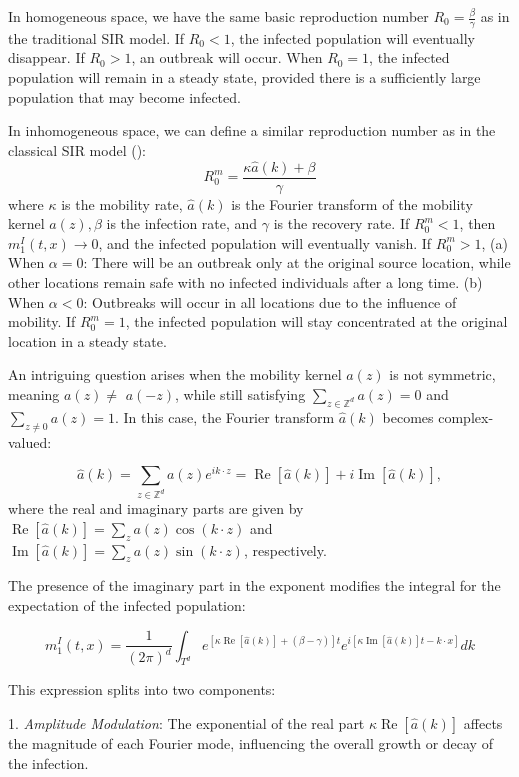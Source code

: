\documentclass[sn-basic]{sn-jnl}%
\theoremstyle{thmstyleone}%
\theoremstyle{thmstyletwo}%
\theoremstyle{thmstylethree}%
\numberwithin{equation}{theorem}
\begin{document}
In homogeneous space, we have the same basic reproduction number $R_0=\frac{\beta}{\gamma}$ as in the traditional SIR model. If $R_0<1$, the infected population will eventually disappear. If $R_0>1$, an outbreak will occur. When $R_0=1$, the infected population will remain in a steady state, provided there is a sufficiently large population that may become infected.

In inhomogeneous space, we can define a similar reproduction number as in the classical SIR model (\citep{allen2008}):
$$
R_0^{m}=\frac{\kappa \hat{a}(k)+\beta}{\gamma}
$$
where $\kappa$ is the mobility rate, $\hat{a}(k)$ is the Fourier transform of the mobility kernel $a(z), \beta$ is the infection rate, and $\gamma$ is the recovery rate. If $R_0^{m}<1$, then $m_1^I(t, x) \rightarrow 0$, and the infected population will eventually vanish. If $R_0^{m}>1$,
(a) When $\alpha=0$: There will be an outbreak only at the original source location, while other locations remain safe with no infected individuals after a long time.
(b) When $\alpha<0$: Outbreaks will occur in all locations due to the influence of mobility. If $R_0^{m}=1$, the infected population will stay concentrated at the original location in a steady state.

    An intriguing question arises when the mobility kernel $a(z)$ is not symmetric, meaning $a(z) \neq$ $a(-z)$, while still satisfying $\sum_{z \in \mathbb{Z}^d} a(z)=0$ and $\sum_{z \neq 0} a(z)=1$. In this case, the Fourier transform $\hat{a}(k)$ becomes complex-valued:

$$
\hat{a}(k)=\sum_{z \in \mathbb{Z}^d} a(z) e^{i k \cdot z}=\operatorname{Re}[\hat{a}(k)]+i \operatorname{Im}[\hat{a}(k)],
$$
where the real and imaginary parts are given by $\operatorname{Re}[\hat{a}(k)]=\sum_z a(z) \cos (k \cdot z)$ and $\operatorname{Im}[\hat{a}(k)]=\sum_z a(z) \sin (k \cdot z)$, respectively.

The presence of the imaginary part in the exponent modifies the integral for the expectation of the infected population:

$$
m_1^I(t, x)=\frac{1}{(2 \pi)^d} \int_{T^d} e^{[\kappa \operatorname{Re}[\hat{a}(k)]+(\beta-\gamma)] t} e^{i[\kappa \operatorname{Im}[\hat{a}(k)] t-k \cdot x]} d k
$$


This expression splits into two components:

1. \textit{Amplitude Modulation}: The exponential of the real part $\kappa \operatorname{Re}[\hat{a}(k)]$ affects the magnitude of each Fourier mode, influencing the overall growth or decay of the infection.
\end{document}
